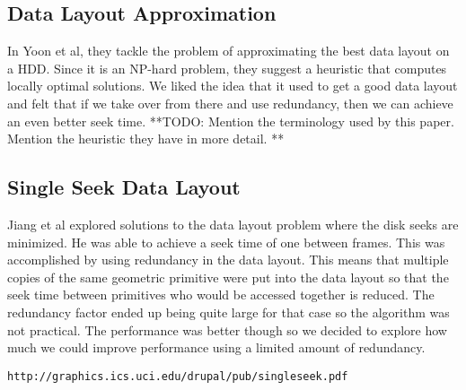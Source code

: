 \documentclass[11pt,psfig]{article}
\begin{document}
\subsection*{Data Layout Approximation}
In Yoon et al, they tackle the problem of approximating the best data layout on a HDD. Since it is an NP-hard problem, they suggest a heuristic that computes locally optimal solutions. We liked the idea that it used to get a good data layout and felt that if we take over from there and use redundancy, then we can achieve an even better seek time.
**TODO: Mention the terminology used by this paper. Mention the heuristic they have in more detail. **\\

\subsection*{Single Seek Data Layout}
Jiang et al explored solutions to the data layout problem where the disk seeks are minimized. He was able to achieve a seek time of one between frames. This was accomplished by using redundancy in the data layout. This means that multiple copies of the same geometric primitive were put into the data layout so that the seek time between primitives who would be accessed together is reduced. The redundancy factor ended up being quite large for that case so the algorithm was not practical. The performance was better though so we decided to explore how much we could improve performance using a limited amount of redundancy. 
\begin{verbatim}
http://graphics.ics.uci.edu/drupal/pub/singleseek.pdf
\end{verbatim}
\end{document}
